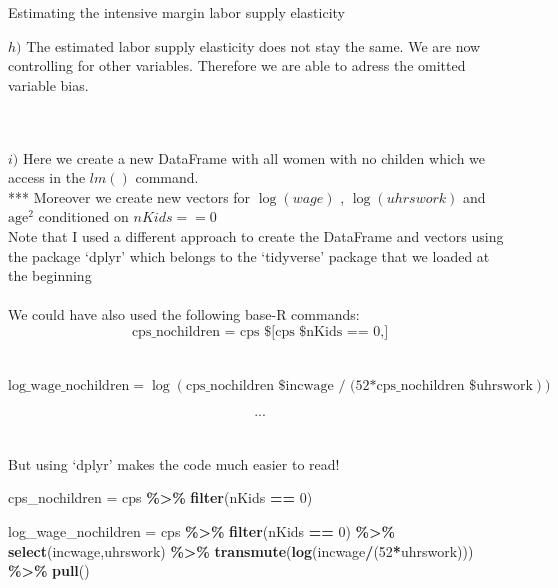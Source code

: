 \documentclass[
  ignorenonframetext,
]{beamer}
\newenvironment{Shaded}{\begin{snugshade}}{\end{snugshade}}
\newcommand{\DecValTok}[1]{\textcolor[rgb]{0.00,0.00,0.81}{#1}}
\newcommand{\KeywordTok}[1]{\textcolor[rgb]{0.13,0.29,0.53}{\textbf{#1}}}
\newcommand{\NormalTok}[1]{#1}
\newcommand{\OperatorTok}[1]{\textcolor[rgb]{0.81,0.36,0.00}{\textbf{#1}}}
\newcommand{\StringTok}[1]{\textcolor[rgb]{0.31,0.60,0.02}{#1}}
\begin{document}
\begin{frame}[fragile]{Estimating the intensive margin labor supply
elasticity}
\begin{block}{\(h)\)}
\hfill\break
The estimated labor supply elasticity does not stay the same. We are now
controlling for other variables. Therefore we are able to adress the
omitted variable bias.\\
~\\
~\\
\end{block}

\begin{block}{\(i)\)}
\protect\hypertarget{i}{}
\hfill\break
Here we create a new DataFrame with all women with no childen which we
access in the \(lm()\) command.\\
*** Moreover we create new vectors for \(\log(wage)\) ,
\(\log(uhrswork)\) and \(\textrm{age}^2\) conditioned on
\(nKids == 0\)\\
Note that I used a different approach to create the DataFrame and
vectors using the package `dplyr' which belongs to the `tidyverse'
package that we loaded at the beginning\\
~\\
We could have also used the following base-R commands:\\
\[\textrm{cps_nochildren = cps \$ [cps \$ nKids == 0,]}\]\\
~\\
\[\textrm{log_wage_nochildren} = \log(\textrm{cps_nochildren \$ incwage / (52*cps_nochildren \$ uhrswork}))\]\\
\[...\]\\
~\\
But using `dplyr' makes the code much easier to read!\\

\begin{Shaded}
\begin{Highlighting}[]
\NormalTok{cps\_nochildren =}\StringTok{ }\NormalTok{cps }\OperatorTok{\%\textgreater{}\%}
\StringTok{  }\KeywordTok{filter}\NormalTok{(nKids }\OperatorTok{==}\StringTok{ }\DecValTok{0}\NormalTok{)}

\NormalTok{log\_wage\_nochildren =}\StringTok{ }\NormalTok{cps }\OperatorTok{\%\textgreater{}\%}
\StringTok{  }\KeywordTok{filter}\NormalTok{(nKids }\OperatorTok{==}\StringTok{ }\DecValTok{0}\NormalTok{) }\OperatorTok{\%\textgreater{}\%}
\StringTok{  }\KeywordTok{select}\NormalTok{(incwage,uhrswork) }\OperatorTok{\%\textgreater{}\%}
\StringTok{  }\KeywordTok{transmute}\NormalTok{(}\KeywordTok{log}\NormalTok{(incwage}\OperatorTok{/}\NormalTok{(}\DecValTok{52}\OperatorTok{*}\NormalTok{uhrswork))) }\OperatorTok{\%\textgreater{}\%}
\StringTok{  }\KeywordTok{pull}\NormalTok{()}



\end{Highlighting}
\end{Shaded}
\end{block}
\end{frame}
\end{document}
